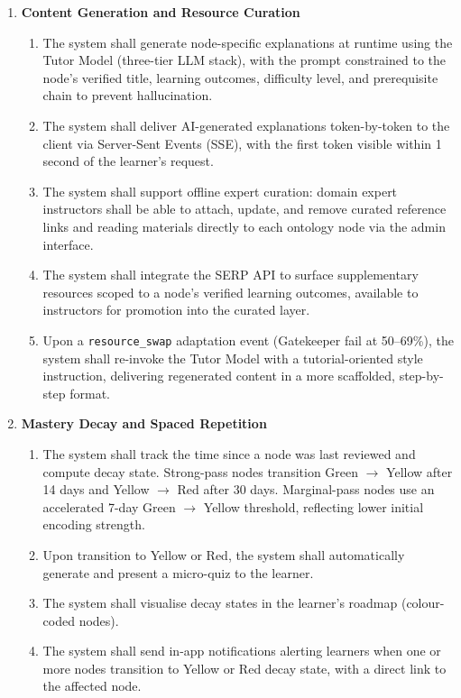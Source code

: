 \begin{enumerate}
    \item[\textbf{FR5:}] \textbf{Content Generation and Resource Curation}
        \begin{enumerate}
            \item[\textbf{FR5.1:}] The system shall generate node-specific explanations at runtime using the Tutor Model (three-tier LLM stack), with the prompt constrained to the node's verified title, learning outcomes, difficulty level, and prerequisite chain to prevent hallucination.
            \item[\textbf{FR5.2:}] The system shall deliver AI-generated explanations token-by-token to the client via Server-Sent Events (SSE), with the first token visible within 1 second of the learner's request.
            \item[\textbf{FR5.3:}] The system shall support offline expert curation: domain expert instructors shall be able to attach, update, and remove curated reference links and reading materials directly to each ontology node via the admin interface.
            \item[\textbf{FR5.4:}] The system shall integrate the SERP API to surface supplementary resources scoped to a node's verified learning outcomes, available to instructors for promotion into the curated layer.
            \item[\textbf{FR5.5:}] Upon a \texttt{resource\_swap} adaptation event (Gatekeeper fail at 50--69\%), the system shall re-invoke the Tutor Model with a tutorial-oriented style instruction, delivering regenerated content in a more scaffolded, step-by-step format.
        \end{enumerate}

    \item[\textbf{FR6:}] \textbf{Mastery Decay and Spaced Repetition}
        \begin{enumerate}
            \item[\textbf{FR6.1:}] The system shall track the time since a node was last reviewed and compute decay state. Strong-pass nodes transition Green $\to$ Yellow after 14 days and Yellow $\to$ Red after 30 days. Marginal-pass nodes use an accelerated 7-day Green $\to$ Yellow threshold, reflecting lower initial encoding strength.
            \item[\textbf{FR6.2:}] Upon transition to Yellow or Red, the system shall automatically generate and present a micro-quiz to the learner.
            \item[\textbf{FR6.3:}] The system shall visualise decay states in the learner's roadmap (colour-coded nodes).
            \item[\textbf{FR6.4:}] The system shall send in-app notifications alerting learners when one or more nodes transition to Yellow or Red decay state, with a direct link to the affected node.
        \end{enumerate}


\end{enumerate}
